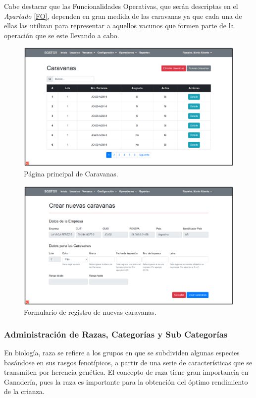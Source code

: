 \documentclass[11pt,oneside]{book}
\begin{document}
Cabe destacar que las Funcionalidades Operativas, que serán descriptas en el \textit{Apartado} \eqref{FO}, dependen en gran medida de las caravanas ya que cada una de ellas las utilizan para representar a aquellos vacunos que formen parte de la operación que se este llevando a cabo.

\begin{figure}[tbhp]
\centerline{\includegraphics[scale=0.87]{figs/capitulo_4_desarrollo/fig412.pdf}}
\caption{Página principal de Caravanas.}
\label{fig412}
\end{figure}

\begin{figure}[tbhp]
\centerline{\includegraphics[scale=0.87]{figs/capitulo_4_desarrollo/fig413.pdf}}
\caption{Formulario de registro de nuevas caravanas.}
\label{fig413}
\end{figure}

\subsubsection{Administración de Razas, Categorías y Sub Categorías}
En biología, raza se refiere a los grupos en que se subdividen algunas especies basándose en sus rasgos fenotípicos, a partir de una serie de características que se transmiten por herencia genética. El concepto de raza tiene gran importancia en Ganadería, pues la raza es importante para la obtención del óptimo rendimiento de la crianza.
\end{document}
